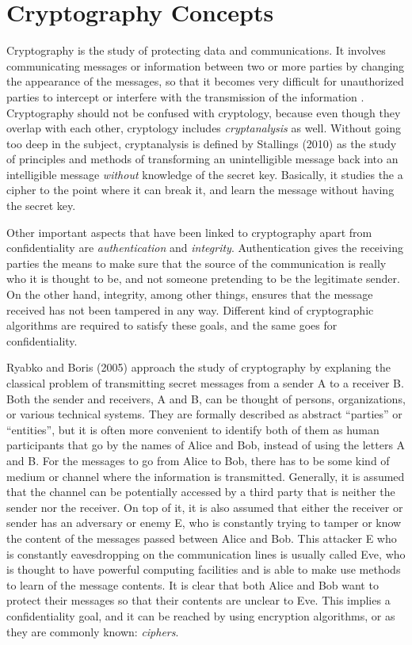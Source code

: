 \section{Cryptography Concepts}

Cryptography is the study of protecting data and communications. It involves communicating messages or information between two or more parties by changing the appearance of the messages, so that it becomes very difficult for unauthorized parties to intercept or interfere with the transmission of the information \cite{IntroCryptoMath}. Cryptography should not be confused with cryptology, because even though they overlap with each other, cryptology includes \emph{cryptanalysis} as well. Without going too deep in the subject, cryptanalysis is defined by Stallings (2010) \cite{CryptoStallings}  as the study of principles and methods of transforming an unintelligible message back into an intelligible message \emph{without} knowledge of the secret key. Basically, it studies the a cipher to the point where it can break it, and learn the message without having the secret key.

Other important aspects that have been linked to cryptography apart from confidentiality are \textit{authentication} and \textit{integrity}. Authentication gives the receiving parties the means to make sure that the source of the communication is really who it is thought to be, and not someone pretending to be the legitimate sender. On the other hand, integrity, among other things, ensures that the message received has not been tampered in any way. Different kind of cryptographic algorithms are required to satisfy these goals, and the same goes for confidentiality.

Ryabko and Boris (2005) \cite{CryptoIT} approach the study of cryptography by explaning the classical problem of transmitting secret messages from a sender A to a receiver B. Both the sender and receivers, A and B, can be thought of persons, organizations, or various technical systems.  They are formally described as abstract ``parties'' or ``entities'', but it is often more convenient to identify both of them as human participants that go by the names of Alice and Bob, instead of using the letters A and B.
For the messages to go from Alice to Bob, there has to be some kind of medium or channel where the information is transmitted. Generally, it is assumed that the channel can be potentially accessed by a third party that is neither the sender nor the receiver. On top of it, it is also assumed that either the receiver or sender has an adversary or enemy E, who is constantly trying to tamper or know the content of the messages passed between Alice and Bob. This attacker E who is constantly eavesdropping on the communication lines is usually called Eve, who is thought to have powerful computing facilities and is able to make use methods to learn of the message contents.  It is clear that both Alice and Bob want to protect their messages so that their contents are unclear to Eve. This implies a confidentiality goal, and it can be reached by using encryption algorithms, or as they are commonly known: \emph{ciphers}.

